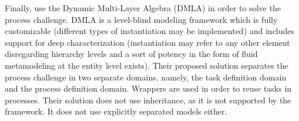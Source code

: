 
Finally, \cite{dmla2019} use the Dynamic Multi-Layer Algebra (DMLA) \parencite{dmla2017} in order to solve the process challenge. DMLA is a level-blind modeling framework which is fully customizable (\eg different types of instantiation may be implemented) and includes support for deep characterization (instantiation may refer to any other element disregarding hierarchy levels and a sort of potency in the form of fluid metamodeling at the entity level exists). Their proposed solution separates the process challenge in two separate domains, namely, the task definition domain and the process definition domain. Wrappers are used in order to reuse tasks in processes. Their solution does not use inheritance, as it is not supported by the framework. It does not use explicitly separated models either.



